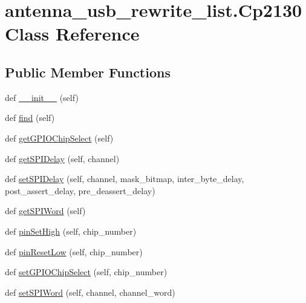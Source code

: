 \hypertarget{classantenna__usb__rewrite__list_1_1_cp2130}{}\section{antenna\+\_\+usb\+\_\+rewrite\+\_\+list.\+Cp2130 Class Reference}
\label{classantenna__usb__rewrite__list_1_1_cp2130}
\subsection*{Public Member Functions}
\begin{DoxyCompactItemize}
\item 
def \hyperlink{classantenna__usb__rewrite__list_1_1_cp2130_aa0f8ffaa6c47fc4e5819ddd29bef7269}{\+\_\+\+\_\+init\+\_\+\+\_\+} (self)
\item 
def \hyperlink{classantenna__usb__rewrite__list_1_1_cp2130_a800f4cc582251bcb96c4b9274b850237}{find} (self)
\item 
def \hyperlink{classantenna__usb__rewrite__list_1_1_cp2130_aa9e6344b116c6590c37994a130a4d1c1}{get\+G\+P\+I\+O\+Chip\+Select} (self)
\item 
def \hyperlink{classantenna__usb__rewrite__list_1_1_cp2130_a12830f282ead3035e3a1cc1f3e6b8dfd}{get\+S\+P\+I\+Delay} (self, channel)
\item 
def \hyperlink{classantenna__usb__rewrite__list_1_1_cp2130_aad4322776cd71e09148d6b9a19419dfa}{set\+S\+P\+I\+Delay} (self, channel, mask\+\_\+bitmap, inter\+\_\+byte\+\_\+delay, post\+\_\+assert\+\_\+delay, pre\+\_\+deassert\+\_\+delay)
\item 
def \hyperlink{classantenna__usb__rewrite__list_1_1_cp2130_aa97587731064b138dbc6211a28b112f1}{get\+S\+P\+I\+Word} (self)
\item 
def \hyperlink{classantenna__usb__rewrite__list_1_1_cp2130_a300ac53e0d29bf85d2dafcee75cc25d2}{pin\+Set\+High} (self, chip\+\_\+number)
\item 
def \hyperlink{classantenna__usb__rewrite__list_1_1_cp2130_ad9db34936c1a4e47ec6332634b3287c6}{pin\+Reset\+Low} (self, chip\+\_\+number)
\item 
def \hyperlink{classantenna__usb__rewrite__list_1_1_cp2130_a5411c8bf8935f8db94959580f85a4315}{set\+G\+P\+I\+O\+Chip\+Select} (self, chip\+\_\+number)
\item 
def \hyperlink{classantenna__usb__rewrite__list_1_1_cp2130_a25793f06c79e2f15f957c50204a9ef1c}{set\+S\+P\+I\+Word} (self, channel, channel\+\_\+word)

\end{DoxyCompactItemize}
